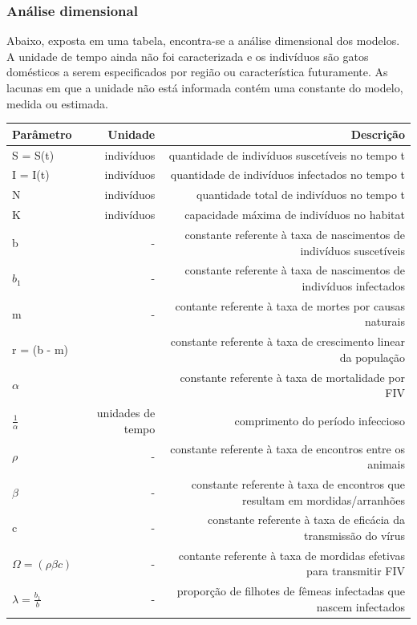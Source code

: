 \documentclass{article}
\begin{document}
\subsubsection{Análise dimensional}
Abaixo, exposta em uma tabela, encontra-se a análise dimensional dos modelos. A unidade de tempo ainda não foi caracterizada e os indivíduos são gatos domésticos a serem especificados por  região ou característica futuramente. As lacunas em que a unidade não está informada contém uma constante do modelo, medida ou estimada.
\begin{table}[!h]
    \centering
\begin{tabular}{| l | r | r |}
\hline
Parâmetro & Unidade & Descrição\\
\hline
S = S(t) & indivíduos & quantidade de indivíduos suscetíveis no tempo t\\
I = I(t) & indivíduos & quantidade de indivíduos infectados no tempo t\\
N & indivíduos & quantidade total de indivíduos no tempo t\\
K & indivíduos & capacidade máxima de indivíduos no habitat\\ 
b         & - & constante referente à taxa de nascimentos de indivíduos suscetíveis\\
$b_1$        & - & constante referente à taxa de nascimentos de indivíduos infectados\\
m        & - & contante referente à taxa de mortes por causas naturais\\
r = (b - m) & & constante referente à taxa de crescimento linear da população\\
$\alpha$ & & constante referente à taxa de mortalidade por FIV \\
$\frac{1}{\alpha}$ & unidades de tempo & comprimento do período infeccioso\\
$\rho$ & - & constante referente à taxa de encontros entre os animais\\
$\beta$ & - & constante referente à taxa de encontros que resultam em mordidas/arranhões\\
c & - & constante referente à taxa de eficácia da transmissão do vírus \\
$\Omega = (\rho\beta c)$ & - & contante referente à taxa de mordidas efetivas para transmitir FIV\\
$\lambda = \frac{b_1}{b}$ & - &  proporção de filhotes de fêmeas infectadas que nascem infectados\\
\hline
\end{tabular}
\end{table}
\end{document}
